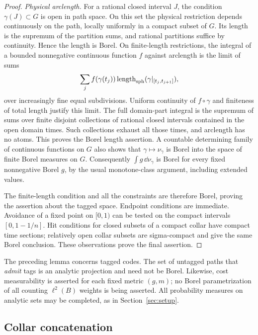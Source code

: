 \begin{proof}
\emph{Physical arclength.}
For a rational closed interval $J$, the condition $\gamma(J)\subset G$
is open in path space.  On this set the physical restriction depends
continuously on the path, locally uniformly in a compact subset of $G$.
Its length is the supremum of the partition sums, and rational
partitions suffice by continuity.  Hence the length is Borel.  On
finite-length restrictions, the integral of a bounded nonnegative
continuous function $f$ against arclength is the limit of sums
\[
 \sum_j f(\gamma(t_j))
       \operatorname{length}_{\mathrm{sph}}(\gamma|_{[t_j,t_{j+1}]}),
\]
over increasingly fine equal subdivisions.  Uniform continuity of
$f\circ\gamma$ and finiteness of total length justify this limit.
The full domain-part integral is the supremum of sums over finite
disjoint collections of rational closed intervals contained in the
open domain times.  Such collections exhaust all those times, and
arclength has no atoms.  This proves the Borel length assertion.
A countable determining family of continuous functions on $G$ also
shows that $\gamma\mapsto\nu_\gamma$ is Borel into the space of
finite Borel measures on $G$.  Consequently
$\int g\,\dd\nu_\gamma$ is Borel for every fixed nonnegative Borel
$g$, by the usual monotone-class argument, including extended values.

The finite-length condition and all the constraints are therefore
Borel, proving the assertion about the tagged space.  Endpoint
conditions are immediate.  Avoidance of a fixed point on $[0,1)$
can be tested on the compact intervals $[0,1-1/n]$.  Hit conditions
for closed subsets of a compact collar have compact time sections;
relatively open collar subsets are sigma-compact and give the same
Borel conclusion.  These observations prove the final assertion.
\end{proof}

\begin{remark}
The preceding lemma concerns tagged codes.  The set of untagged paths
that \emph{admit} tags is an analytic projection and need not be Borel.
Likewise, cost measurability is asserted for each fixed metric $(g,m)$;
no Borel parametrization of all counting $\ell^2(B)$ weights is being
asserted.  All probability measures on analytic sets may be completed,
as in Section~\ref{sec:setup}.
\end{remark}

\subsection{Collar concatenation}

